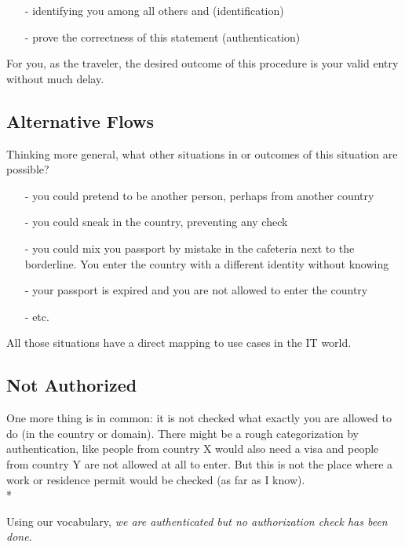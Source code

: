 \begin{enumerate}
    \item[-] identifying you among all others and (identification)
    \item[-] prove the correctness of this statement (authentication)
\end{enumerate}

For you, as the traveler, the desired outcome of this procedure is your
valid entry without much delay.


\subsection{Alternative Flows}

Thinking more general, what other situations in or outcomes of this
situation are possible?

\begin{itemize}
    \item[-] you could pretend to be another person, perhaps from another country
    \item[-] you could sneak in the country, preventing any check
    \item[-] you could mix you passport by mistake in the cafeteria next to the borderline. 
        You enter the country with a different identity without knowing
    \item[-] your passport is expired and you are not allowed to enter the country
    \item[-] etc.
\end{itemize}

All those situations have a direct mapping to use cases in the IT world.

\subsection{Not Authorized}

One more thing is in common: it is not checked what exactly you are
allowed to do (in the country or domain). There might be a rough
categorization by authentication, like people from country X would also
need a visa and people from country Y are not allowed at all to enter.
But this is not the place where a work or residence permit would be
checked (as far as I know).\\*

Using our vocabulary, \emph{we are authenticated but no authorization 
check has been done}.


